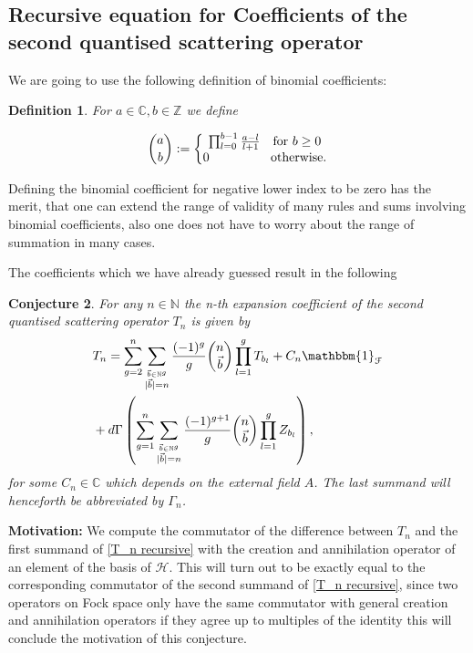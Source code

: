 \documentclass[b5paper,draft,openbib,12pt]{memoir}
\newtheorem{Def}{Definition}
\newtheorem{Conj}[Def]{Conjecture}
\newcommand{\id}{\mathbbm{1}}
\begin{document}
\subsection{Recursive equation for Coefficients of the second quantised scattering operator}

We are going to use the following definition of binomial coefficients:
\begin{Def}
For \(a\in\mathbb{C}, b\in\mathbb{Z}\) we define

\begin{equation}
\binom{a}{b} := \left\{\begin{matrix}
\prod_{l=0}^{b-1} \frac{a-l}{l+1} \quad \text{for } b\ge 0\\
0 \hspace{1.7cm} \text{otherwise.}
\end{matrix}\right.
\end{equation}
\end{Def}

Defining the binomial coefficient for negative lower index to be zero has the merit, that one can extend the
range of validity of many rules and sums involving binomial coefficients, also one does not have 
to worry about the range of summation in many cases.



The coefficients which we have already guessed 
result in the following
\begin{Conj}\label{thm: T_n recursive}
For any \(n\in\mathbb{N}\) the n-th expansion coefficient of the second quantised scattering operator \(T_n\) is given by
\begin{align}\notag
&T_n = \sum_{g=2}^n \sum_{\stackrel{\vec{b}\in\mathbb{N}^g}{|\vec{b}|=n}}\frac{(-1)^g}{g} 
\binom{n}{\vec{b}} \prod_{l=1}^g T_{b_l} + C_n \id_{\mathcal{F}} \\ \label{T_n recursive}
&+ d\Gamma\left( \sum_{g=1}^n \sum_{\stackrel{\vec{b}\in\mathbb{N}^g}{|\vec{b}|=n}}\frac{(-1)^{g+1}}{g} 
\binom{n}{\vec{b}} \prod_{l=1}^g Z_{b_l}  \right),
\end{align}
for some \(C_n\in \mathbb{C}\) which depends on the external field \(A\). The last summand will henceforth
be abbreviated by \(\Gamma_n\).
\end{Conj}

\textbf{Motivation:} We compute the commutator of the difference between \(T_n\) and
the first summand of \eqref{T_n recursive} with the creation and annihilation operator of an element of the
basis of \(\mathcal{H}\). This will turn out to be exactly equal
to the corresponding commutator
of the second summand of \eqref{T_n recursive}, since two operators on Fock space only
have the same commutator with general creation and annihilation operators if they
agree up to multiples of the identity this will conclude the motivation of this conjecture. 
\end{document}
